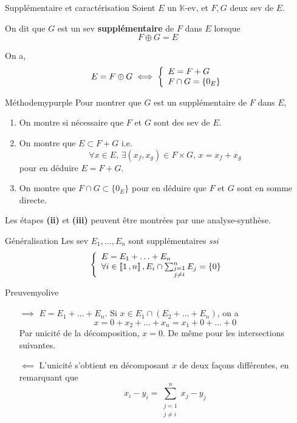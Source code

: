     \begin{defitheo}{Supplémentaire et caractérisation}{}
        Soient $E$ un $\mathbb{K}$-ev, et $F,G$ deux sev de $E$.

        On dit que $G$ est un sev \textbf{supplémentaire} de $F$ dans $E$ lorsque 
        \[ F \oplus G = E \]

        On a, 
        \[ E = F \oplus G \iff \et{E = F + G}{F \cap G = \{ 0_E \} } \]
    \end{defitheo}

    \begin{omed}{Méthode}{mypurple}
        Pour montrer que $G$ est un supplémentaire de $F$ dans $E$,
        \begin{enumerate}
            \item On montre si nécessaire que $F$ et $G$ sont des sev de $E$.
            \item On montre que $E \subset F + G$ i.e.
            \[ \forall x \in E,\, \exists (x_f, x_g) \in F \times G, \, x = x_f + x_g \] 
            pour en déduire $E = F + G$.
            \item On montre que $F \cap G \subset \{ 0_E \}$ pour en déduire que $F$ et $G$ sont en somme directe.
        \end{enumerate}
        Les étapes \textbf{(ii)} et \textbf{(iii)} peuvent être montrées par une analyse-synthèse.
    \end{omed}

    \begin{prop}{Généralisation}{}
        Les sev $E_1,\ldots,E_n$ sont supplémentaires \textit{ssi} 
        \[ \et{E = E_1 + \ldots + E_n}{\forall i \in \intervalleEntier{1}{n}, E_i \cap \sum_{\substack{j = 1 \\ j \neq i}}^{n} E_j = \{0\}} \]
    \end{prop}

    \begin{demo}{Preuve}{myolive}
        \begin{itemize}
            \item[\textcolor{myolive}{$\implies$}] $E = E_1 + \ldots + E_n$. Si $x \in E_1 \cap (E_2 + \ldots + E_n)$, on a 
            \[ x = 0 + x_2 +\ldots + x_n = x_1 + 0 + \ldots + 0 \]
            Par unicité de la décomposition, $x = 0$. De même pour les intersections suivantes.
            \item[\textcolor{myolive}{$\impliedby$}] L’unicité s’obtient en décomposant $x$ de deux façons différentes, en remarquant que 
            \[ x_i - y_i = \sum_{\substack{j = 1 \\ j \neq i}}^{n} x_j - y_j \]
        \end{itemize}
    \end{demo}

